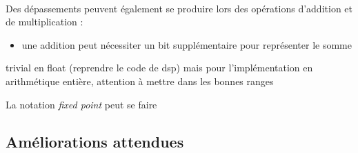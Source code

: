 \documentclass{article}
\begin{document}
    \paragraph{}
    Des dépassements peuvent également se produire lors des opérations d'addition et de multiplication :
    \begin{itemize}
        \item une addition peut nécessiter un bit supplémentaire pour représenter le somme 
    \end{itemize}


    trivial en float (reprendre le code de dsp) mais pour l'implémentation en arithmétique entière, attention à mettre dans les bonnes ranges

    La notation \emph{fixed point} peut se faire 



    \subsection{Améliorations attendues}
    \paragraph{}
\end{document}
